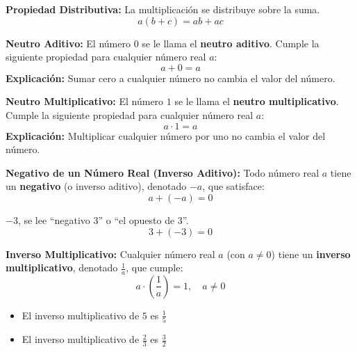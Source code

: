 \begin{definition}
\textbf{Propiedad Distributiva:} La multiplicación se distribuye sobre la suma.
$$a(b + c) = ab + ac$$
\end{definition}


\begin{definition}
\textbf{Neutro Aditivo:} El número $0$ se le llama el \textbf{neutro aditivo}. Cumple la siguiente propiedad para cualquier número real $a$:
$$a + 0 = a$$
\textbf{Explicación:} Sumar cero a cualquier número no cambia el valor del número.
\end{definition}

\begin{definition}
\textbf{Neutro Multiplicativo:} El número $1$ se le llama el \textbf{neutro multiplicativo}. Cumple la siguiente propiedad para cualquier número real $a$:
$$a \cdot 1 = a$$
\textbf{Explicación:} Multiplicar cualquier número por uno no cambia el valor del número.
\end{definition}


\begin{definition}
\textbf{Negativo de un Número Real (Inverso Aditivo):} Todo número real $a$ tiene un \textbf{negativo} (o inverso aditivo), denotado $-a$, que satisface:
$$a + (-a) = 0$$
\end{definition}

\begin{example}
$-3$, se lee ``negativo 3'' o ``el opuesto de 3''.
$$3 + (-3) = 0$$
\end{example}

\begin{definition}
\textbf{Inverso Multiplicativo:} Cualquier número real $a$ (con $a \neq 0$) tiene un \textbf{inverso multiplicativo}, denotado $\frac{1}{a}$, que cumple:
$$a \cdot \left(\frac{1}{a}\right) = 1, \quad a \neq 0$$
\end{definition}

\begin{example}
\begin{itemize}
\item El inverso multiplicativo de $5$ es $\frac{1}{5}$
\item El inverso multiplicativo de $\frac{2}{3}$ es $\frac{3}{2}$
\end{itemize}
\end{example}

